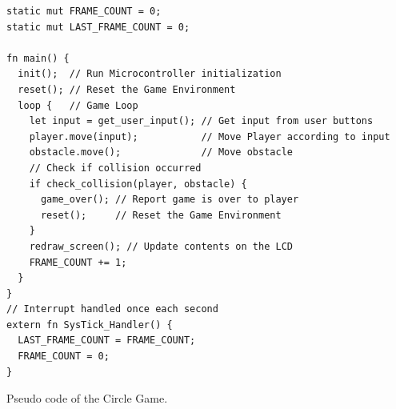 \begin{listing}[H]
  \begin{verbatim}
static mut FRAME_COUNT = 0;
static mut LAST_FRAME_COUNT = 0;

fn main() {
  init();  // Run Microcontroller initialization
  reset(); // Reset the Game Environment
  loop {   // Game Loop
    let input = get_user_input(); // Get input from user buttons
    player.move(input);           // Move Player according to input
    obstacle.move();              // Move obstacle
    // Check if collision occurred
    if check_collision(player, obstacle) {
      game_over(); // Report game is over to player
      reset();     // Reset the Game Environment
    }
    redraw_screen(); // Update contents on the LCD
    FRAME_COUNT += 1;
  }
}
// Interrupt handled once each second
extern fn SysTick_Handler() {
  LAST_FRAME_COUNT = FRAME_COUNT;
  FRAME_COUNT = 0;
}
  \end{verbatim}
  \caption{Pseudo code of the Circle Game.}
  \label{lst:game_loop}
\end{listing}
